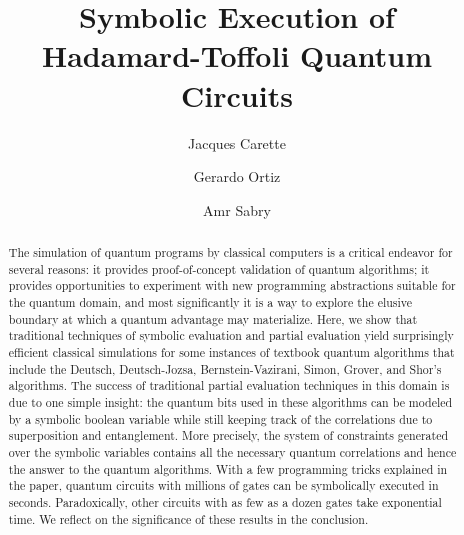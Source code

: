 \documentclass[sigplan,screen]{acmart}
\theoremstyle{definition}
\begin{document}
\title[Symbolic Quantum Execution]{Symbolic Execution of \\
  Hadamard-Toffoli Quantum Circuits}

\author{Jacques Carette}

\author{Gerardo Ortiz}

\author{Amr Sabry}

\begin{abstract}
  The simulation of quantum programs by classical computers is a critical endeavor
  for several reasons: it provides proof-of-concept validation of
  quantum algorithms; it provides opportunities to experiment with new
  programming abstractions suitable for the quantum domain, and most
  significantly it is a way to explore the elusive boundary at which a
  quantum advantage may materialize. Here, we show that traditional
  techniques of symbolic evaluation and partial evaluation yield
  surprisingly efficient classical simulations for some instances of
  textbook quantum algorithms that include the Deutsch, Deutsch-Jozsa,
  Bernstein-Vazirani, Simon, Grover, and Shor's algorithms. The success
  of traditional partial evaluation techniques in this domain is due
  to one simple insight: the quantum bits used in these algorithms can
  be modeled by a symbolic boolean variable while still keeping track
  of the correlations due to superposition and entanglement. More
  precisely, the system of constraints generated over the symbolic
  variables contains all the necessary quantum correlations and hence
  the answer to the quantum algorithms. With a few programming tricks
  explained in the paper, quantum circuits with millions of gates can
  be symbolically executed in seconds. Paradoxically, other circuits
  with as few as a dozen gates take exponential time. We reflect on
  the significance of these results in the conclusion.
\end{abstract}
\end{document}
